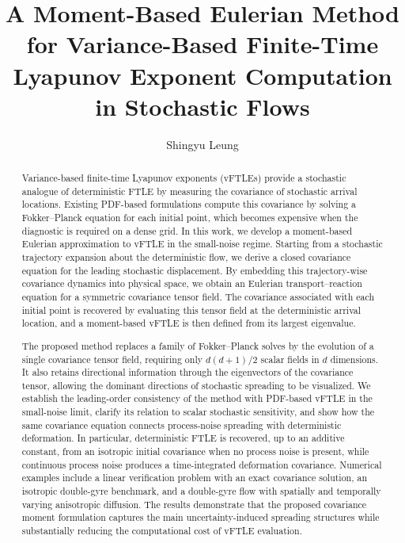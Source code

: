 \documentclass[a4paper,11pt]{article}
\title{A Moment-Based Eulerian Method for Variance-Based Finite-Time Lyapunov Exponent Computation in Stochastic Flows}
\author{Shingyu Leung}
\date{}
\numberwithin{equation}{section}
\theoremstyle{plain}
\theoremstyle{definition}
\theoremstyle{remark}
\begin{document}
\maketitle


\begin{abstract}
Variance-based finite-time Lyapunov exponents (vFTLEs) provide a stochastic analogue of deterministic FTLE by measuring the covariance of stochastic arrival locations.  Existing PDF-based formulations compute this covariance by solving a Fokker--Planck equation for each initial point, which becomes expensive when the diagnostic is required on a dense grid.  In this work, we develop a moment-based Eulerian approximation to vFTLE in the small-noise regime.  Starting from a stochastic trajectory expansion about the deterministic flow, we derive a closed covariance equation for the leading stochastic displacement.  By embedding this trajectory-wise covariance dynamics into physical space, we obtain an Eulerian transport--reaction equation for a symmetric covariance tensor field.  The covariance associated with each initial point is recovered by evaluating this tensor field at the deterministic arrival location, and a moment-based vFTLE is then defined from its largest eigenvalue.

The proposed method replaces a family of Fokker--Planck solves by the evolution of a single covariance tensor field, requiring only \(d(d+1)/2\) scalar fields in \(d\) dimensions.  It also retains directional information through the eigenvectors of the covariance tensor, allowing the dominant directions of stochastic spreading to be visualized.  We establish the leading-order consistency of the method with PDF-based vFTLE in the small-noise limit, clarify its relation to scalar stochastic sensitivity, and show how the same covariance equation connects process-noise spreading with deterministic deformation.  In particular, deterministic FTLE is recovered, up to an additive constant, from an isotropic initial covariance when no process noise is present, while continuous process noise produces a time-integrated deformation covariance.  Numerical examples include a linear verification problem with an exact covariance solution, an isotropic double-gyre benchmark, and a double-gyre flow with spatially and temporally varying anisotropic diffusion.  The results demonstrate that the proposed covariance moment formulation captures the main uncertainty-induced spreading structures while substantially reducing the computational cost of vFTLE evaluation.
\end{abstract}
\end{document}
